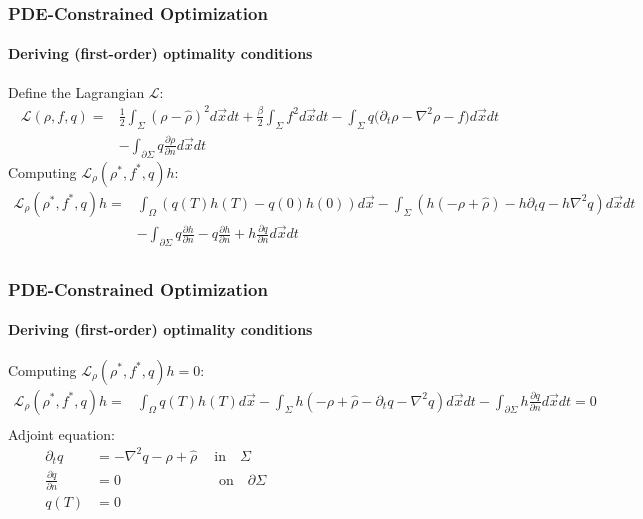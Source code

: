 \documentclass[aspectratio=169,xcolor=dvipsnames]{beamer}
\begin{document}
\begin{frame}
	\frametitle{PDE-Constrained Optimization}
	\framesubtitle{Deriving (first-order) optimality conditions}
	Define the Lagrangian $\mathcal{L}$:
	\begin{align*}
		\mathcal{L}(\rho, f,q)=& \frac{1}{2}\int_\Sigma \left(\rho- \widehat{\rho}\right)^2 d \vec x dt + \frac{\beta}{2} \int_\Sigma f^2 d \vec x dt - \int_\Sigma q \bigg( \partial_t \rho - \nabla^2 \rho  - f \bigg) d\vec{x} dt \\
		&- \int_{\partial \Sigma} q \frac{\partial \rho}{\partial n}   d\vec{x} dt
	\end{align*}
	Computing  $\mathcal{L}_\rho (\rho^*, f^*,q)h$:
	\begin{align*}
		\mathcal{L}_\rho (\rho^*, f^*,q)h = & \int_\Omega \left(q(T) h(T) - q(0) h(0)\right)d \vec x  - \int_\Sigma \left(h(-\rho + \widehat \rho)  - h \partial_t q - h\nabla^2 q  \right) d\vec{x} dt \\
		&-\int_{\partial \Sigma} q \frac{\partial h}{\partial n}  - q \frac{\partial h}{\partial n} + h \frac{\partial q}{\partial n} d\vec{x} dt \\
	\end{align*}
\end{frame}
\begin{frame}
	\frametitle{PDE-Constrained Optimization}
	\framesubtitle{Deriving (first-order) optimality conditions}
	Computing  $\mathcal{L}_\rho (\rho^*, f^*,q)h = 0$:
	\begin{align*}
		\mathcal{L}_\rho (\rho^*, f^*,q)h = & \int_\Omega q(T) h(T) d \vec x  - \int_\Sigma h \left(-\rho + \widehat \rho  - \partial_t q -  \nabla^2 q  \right) d\vec{x} dt - \int_{\partial \Sigma}  h \frac{\partial q}{\partial n} d\vec{x} dt = 0\\
	\end{align*}
Adjoint equation:
\begin{align*}
	  \partial_t q &=  -  \nabla^2 q -\rho + \widehat \rho  \ \quad \text{in} \quad \Sigma \qquad \qquad\qquad\qquad\qquad\qquad\qquad\qquad\\
	  \frac{\partial q}{\partial n} &= 0 \qquad\qquad\quad\quad \quad \text{on} \quad \partial \Sigma\\
	  q(T) &=0
\end{align*}
\end{frame}
\end{document}
